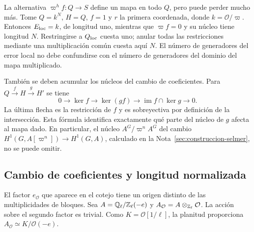 La alternativa $\varpi^h f:Q\to S$ define un mapa en todo $Q$,
pero puede perder mucho más. Tome $Q=k^N$, $H=Q$, $f=1$ y
$r$ la primera coordenada, donde $k=\mathcal O/\varpi$.
Entonces $E_{\rm loc}=k$, de longitud uno, mientras que
$\varpi f=0$ y su núcleo tiene longitud $N$.
Restringirse a $Q_{\rm loc}$ cuesta uno; anular todas las
restricciones mediante una multiplicación común cuesta aquí $N$.
El número de generadores del error local no debe confundirse con
el número de generadores del dominio del mapa multiplicado.

También se deben acumular los núcleos del cambio de coeficientes.
Para $Q\xrightarrow{f}H\xrightarrow{g}H'$ se tiene
\[
 0\longrightarrow\ker f\longrightarrow\ker(gf)
 \longrightarrow\operatorname{im}f\cap\ker g\longrightarrow0.
\]
La última flecha es la restricción de $f$ y es sobreyectiva
por definición de la intersección. Esta fórmula identifica
exactamente qué parte del núcleo de $g$ afecta al mapa dado.
En particular, el núcleo
$A^G/\varpi^n A^G$ del cambio
$H^1(G,A[\varpi^n])\to H^1(G,A)$, calculado en la
Nota~\ref{sec:construccion-selmer}, no se puede omitir.

\subsection{Cambio de coeficientes y longitud normalizada}

El factor $e_{\mathcal O}$ que aparece en el cotejo tiene un origen
distinto de las multiplicidades de bloques.
Sea $A=\mathbb{Q}_\ell/\mathbb{Z}_\ell(-e)$ y
$A_{\mathcal O}=A\otimes_{\mathbb{Z}_\ell}\mathcal O$.
La acción sobre el segundo factor es trivial.
Como $K=\mathcal O[1/\ell]$, la planitud proporciona
$A_{\mathcal O}\simeq K/\mathcal O(-e)$.

